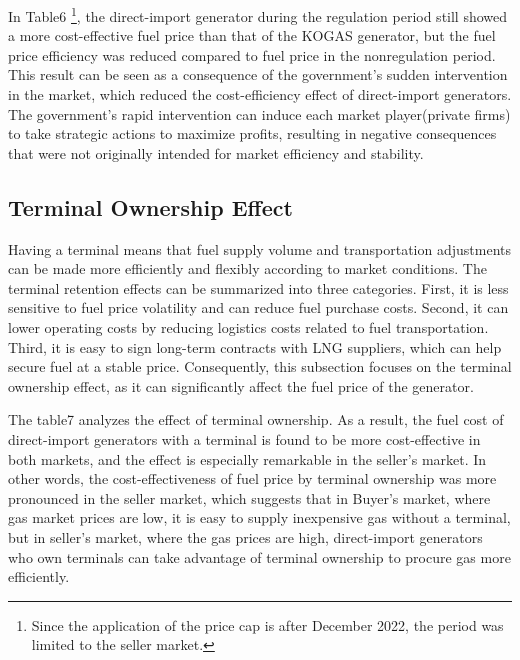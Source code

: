 \documentclass[12pt]{article}
\begin{document}
In Table6 \footnote{Since the application of the price cap is after December 2022, the period was limited to the seller market.}, the direct-import generator during the regulation period still showed a more cost-effective fuel price than that of the KOGAS generator, but the fuel price efficiency was reduced compared to fuel price in the nonregulation period. This result can be seen as a consequence of the government's sudden intervention in the market, which reduced the cost-efficiency effect of direct-import generators. The government's rapid intervention can induce each market player(private firms) to take strategic actions to maximize profits, resulting in negative consequences that were not originally intended for market efficiency and stability.






\subsection{Terminal Ownership Effect}

Having a terminal means that fuel supply volume and transportation adjustments can be made more efficiently and flexibly according to market conditions. The terminal retention effects can be summarized into three categories.
First, it is less sensitive to fuel price volatility and can reduce fuel purchase costs. Second, it can lower operating costs by reducing logistics costs related to fuel transportation. Third, it is easy to sign long-term contracts with LNG suppliers, which can help secure fuel at a stable price.
Consequently, this subsection focuses on the terminal ownership effect, as it can significantly affect the fuel price of the generator.

The table7 analyzes the effect of terminal ownership. As a result, the fuel cost of direct-import generators with a terminal is found to be more cost-effective in both markets, and the effect is especially remarkable in the seller's market. In other words, the cost-effectiveness of fuel price by terminal ownership was more pronounced in the seller market, which suggests that in Buyer's market, where gas market prices are low, it is easy to supply inexpensive gas without a terminal, but in seller's market, where the gas prices are high, direct-import generators who own terminals can take advantage of terminal ownership to procure gas more efficiently.
\end{document}
